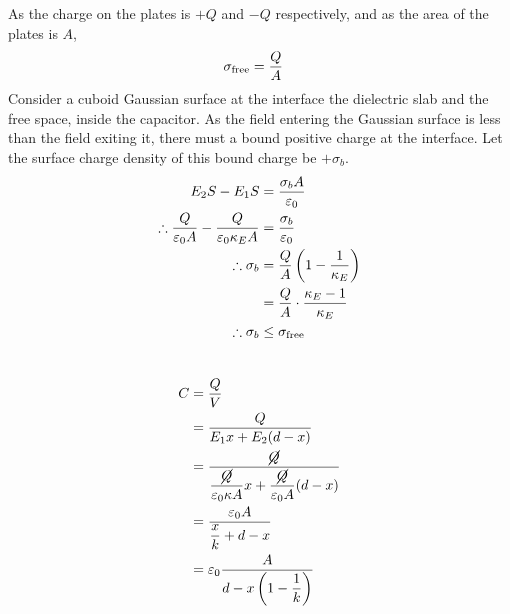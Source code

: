 \documentclass[fleqn, a4paper, 12pt, twoside]{article}
\theoremstyle{definition}
\theoremstyle{theorem}
\begin{document}
\begin{solution}
	As the charge on the plates is $+Q$ and $-Q$ respectively, and as the area of the plates is $A$,
	\begin{align*}
		\sigma_{\textnormal{free}} & = \dfrac{Q}{A}
	\end{align*}
	Consider a cuboid Gaussian surface at the interface the dielectric slab and the free space, inside the capacitor.
	As the field entering the Gaussian surface is less than the field exiting it, there must a bound positive charge at the interface.
	Let the surface charge density of this bound charge be $+\sigma_b$.
	\begin{align*}
		E_2 S - E_1 S                                                               & = \dfrac{\sigma_b A}{\varepsilon_0}                   \\
		\therefore \dfrac{Q}{\varepsilon_0 A} - \dfrac{Q}{\varepsilon_0 \kappa_E A} & = \dfrac{\sigma_b}{\varepsilon_0}                     \\
		\therefore \sigma_b                                                         & = \dfrac{Q}{A} \left( 1 - \dfrac{1}{\kappa_E} \right) \\
                                                                                            & = \dfrac{Q}{A} \cdot \dfrac{\kappa_E - 1}{\kappa_E}   \\
		\therefore \sigma_b                                                         & \le \sigma_{\textnormal{free}}
	\end{align*}
	~\\
	\begin{align*}
		C & = \dfrac{Q}{V}                                                                                                   \\
                  & = \dfrac{Q}{E_1 x + E_2 (d - x)}                                                                                 \\
                  & = \dfrac{\cancel{Q}}{\dfrac{\cancel{Q}}{\varepsilon_0 \kappa A} x + \dfrac{\cancel{Q}}{\varepsilon_0 A} (d - x)} \\
                  & = \dfrac{\varepsilon_0 A}{\dfrac{x}{k} + d - x}                                                                  \\
                  & = \varepsilon_0 \dfrac{A}{d - x \left( 1 - \dfrac{1}{k} \right)}
	\end{align*}
\end{solution}

\newpage
\end{document}
